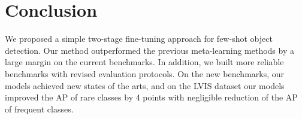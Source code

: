 \section{Conclusion}
We proposed a simple two-stage fine-tuning approach for few-shot object detection.
Our method outperformed the previous meta-learning methods by a large margin on the current benchmarks.
In addition, we built more reliable benchmarks with revised evaluation protocols.
On the new benchmarks, our models achieved new states of the arts, and on the LVIS dataset our models improved the AP of rare classes by 4 points with negligible reduction of the AP of frequent classes.




